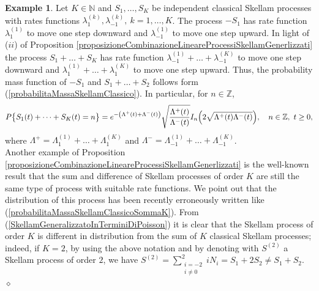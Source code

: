 \documentclass[12pt, twoside, english, headsepline]{article}
\theoremstyle{definition} %
\newtheorem{example}{Example}[section]
\numberwithin{equation}{section} %
\begin{document}
\begin{example}
Let $K\in\mathbb{N}$ and $S_1,\dots,S_K$ be independent classical Skellam processes with rates functions $\lambda_1^{(k)},\lambda_{-1}^{(k)},\ k=1,\dots, K$. The process $-S_1$ has rate function $\lambda_1^{(1)}$ to move one step downward and $\lambda_{-1}^{(1)}$ to move one step upward. In light of ($ii$) of Proposition \ref{proposizioneCombinazioneLineareProcessiSkellamGenerlizzati} the process $S_1+\dots + S_K$ has rate function  $\lambda_{-1}^{(1)}+\dots+\lambda_{-1}^{(K)}$ to move one step downward and $\lambda_1^{(1)}+\dots+\lambda_1^{(K)}$ to move one step upward. Thus, the probability mass function of $-S_1$ and $S_1+\dots+S_2$ follows form (\ref{probabilitaMassaSkellamClassico}). In particular, for $n\in\mathbb{Z}$, 
\begin{equation}\label{probabilitaMassaSkellamClassicoSommaK}
P\big\{S_1(t)+\dots+S_K(t) = n\big\}= e^{-\left(\Lambda^+(t)+\Lambda^-(t)\right)} \sqrt{\frac{\Lambda^+(t)}{\Lambda^-(t)}} I_n\Bigl(2\sqrt{\Lambda^+(t)\Lambda^-(t)}\Bigr), \ \ \ n\in\mathbb{Z}, \ t\ge0,
\end{equation}
where $\Lambda^+ = \Lambda_{1}^{(1)}+\dots+\Lambda_{1}^{(K)}$ and $\Lambda^- = \Lambda_{-1}^{(1)}+\dots+\Lambda_{-1}^{(K)}$.
\\
Another example of Proposition \ref{proposizioneCombinazioneLineareProcessiSkellamGenerlizzati} is the well-known result that the sum and difference of Skellam processes of order $K$ are still the same type of process with suitable rate functions. We point out that the distribution of this process has been recently erroneously written like (\ref{probabilitaMassaSkellamClassicoSommaK}). From (\ref{SkellamGeneralizzatoInTerminiDiPoisson}) it is clear that the Skellam process of order $K$ is different in distribution from the sum of $K$ classical Skellam processes; indeed, if $K=2$, by using the above notation and by denoting with $S^{(2)}$ a Skellam process of order $2$, we have $S^{(2)} = \sum_{\substack{i=-2\\i\not=0}}^2 i N_i = S_1 + 2S_2\not= S_1+S_2 $.
\hfill$\diamond$
\end{example}
\end{document}

